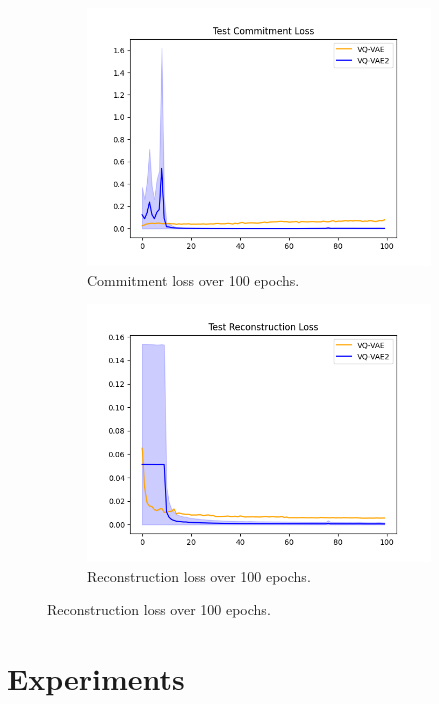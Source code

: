 \documentclass{article}
\begin{document}
\begin{figure}[!h]
    \centering
    \begin{subfigure}{.49\linewidth}
        \centering
        \includegraphics[width=\linewidth]{commit.png}
        \caption{Commitment loss over 100 epochs.}
    \end{subfigure}
    \begin{subfigure}{.49\linewidth}
        \centering
        \includegraphics[width=\linewidth]{recon.png}
        \caption{Reconstruction loss over 100 epochs.}
    \end{subfigure}
    \label{fig:loss}
\end{figure}

\section{Experiments}
\end{document}
